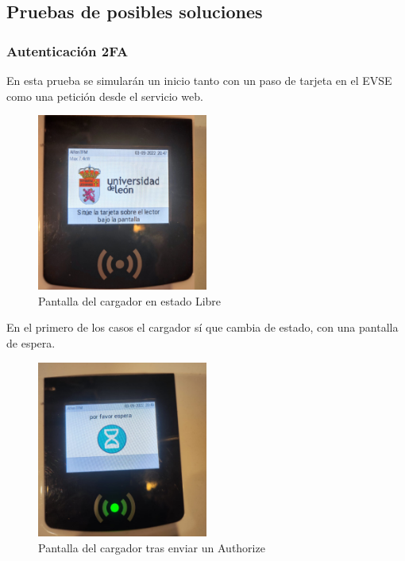 \documentclass[12pt,a4paper,onecolumn,oneside]{report}
\begin{document}
\subsection{Pruebas de posibles soluciones}

\subsubsection{Autenticación 2FA}

En esta prueba se simularán un inicio tanto con un paso de tarjeta en el EVSE como una petición desde el servicio web.

\begin{figure}[H] 
\centering
  \includegraphics[width=0.5\textwidth]{figuras/prueba1.png}
  \caption[Pantalla del cargador en estado \textit{Libre}]{Pantalla del cargador en estado Libre\\
  }
  \label{fig:prueba1}
\end{figure}

En el primero de los casos el cargador sí que cambia de estado, con una pantalla de espera.

\begin{figure}[H] 
\centering
  \includegraphics[width=0.5\textwidth]{figuras/prueba2.png}
  \caption[Pantalla del cargador tras enviar un \textit{Authorize}]{Pantalla del cargador tras enviar un Authorize\\
  }
  \label{fig:prueba2}
\end{figure}
\end{document}
